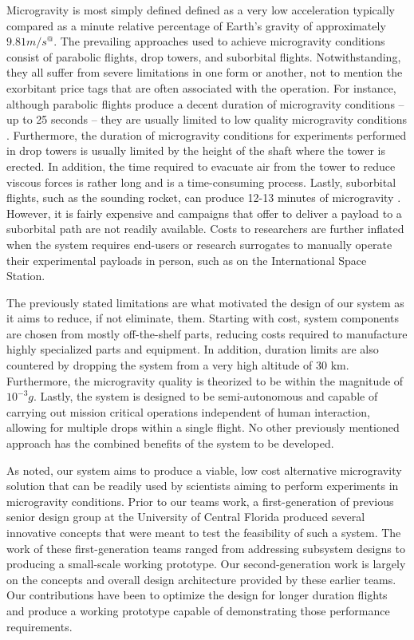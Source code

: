 \indent\indent Microgravity is most simply defined defined as a very low acceleration typically compared as a minute relative percentage of Earth's gravity of approximately $9.81 m/s^@$. The prevailing approaches used to achieve microgravity conditions consist of parabolic flights, drop towers, and suborbital flights. Notwithstanding, they all suffer from severe limitations in one form or another, not to mention the exorbitant price tags that are often associated with the operation. For instance, although parabolic flights produce a decent duration of microgravity conditions – up to 25 seconds – they are usually limited to low quality microgravity conditions \cite{Novespace}. Furthermore, the duration of microgravity conditions for experiments performed in drop towers is usually limited by the height of the shaft where the tower is erected. In addition, the time required to evacuate air from the tower to reduce viscous forces is rather long and is a time-consuming process. Lastly, suborbital flights, such as the sounding rocket, can produce 12-13 minutes of microgravity \cite{GAC}. However, it is fairly expensive and campaigns that offer to deliver a payload to a suborbital path are not readily available. Costs to researchers are further inflated when the system requires end-users or research surrogates to manually operate their experimental payloads in person, such as on the International Space Station.

The previously stated limitations are what motivated the design of our system as it aims to reduce, if not eliminate, them. Starting with cost, system components are chosen from mostly off-the-shelf parts, reducing costs required to manufacture highly specialized parts and equipment. In addition, duration limits are also countered by dropping the system from a very high altitude of 30 km. Furthermore, the microgravity quality is theorized to be within the magnitude of $10^{\minus 3}g$. Lastly, the system is designed to be semi-autonomous and capable of carrying out mission critical operations independent of human interaction, allowing for multiple drops within a single flight. No other previously mentioned approach has the combined benefits of the system to be developed.

As noted, our system aims to produce a viable, low cost alternative microgravity solution that can be readily used by scientists aiming to perform experiments in microgravity conditions. Prior to our teams work, a first-generation of previous senior design group at the University of Central Florida produced several innovative concepts that were meant to test the feasibility of such a system. The work of these first-generation teams ranged from addressing subsystem designs to producing a small-scale working prototype. Our second-generation work is largely on the concepts and overall design architecture provided by these earlier teams. Our contributions have been to optimize the design for longer duration flights and produce a working prototype capable of demonstrating those performance requirements. 


